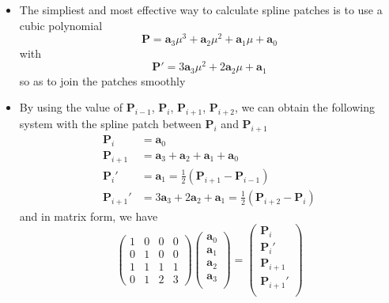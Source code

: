 \documentclass[twocolumn,landscape,10pt]{article}
\theoremstyle{definition}
\begin{document}
\begin{itemize}
    \item The simpliest and most effective way to calculate spline patches is to
        use a cubic polynomial
        \[
            \mathbf{P}=\mathbf{a}_3\mu^3+\mathbf{a}_2\mu^{2}+\mathbf{a}_1\mu+\mathbf{a}_0
        \]
        with
        \[
            \mathbf{P}'=3\mathbf{a}_3\mu^2+2\mathbf{a}_2\mu+\mathbf{a}_1
        \]
        so as to join the patches smoothly
    \item By using the value of $\mathbf{P}_{i-1}$, $\mathbf{P}_i$,
        $\mathbf{P}_{i+1}$, $\mathbf{P}_{i+2}$,
        we can obtain the following system with the spline patch
        between $\mathbf{P}_i$ and $\mathbf{P}_{i+1}$
        \begin{align*}
            \mathbf{P}_i &= \mathbf{a}_0 \\
            \mathbf{P}_{i+1} &= \mathbf{a}_3+\mathbf{a}_2+\mathbf{a}_1+\mathbf{a}_0 \\
            \mathbf{P}_i' &= \mathbf{a}_1 =
            \frac{1}{2}(\mathbf{P}_{i+1}-\mathbf{P}_{i-1}) \\
            \mathbf{P}_{i+1}' &=3\mathbf{a}_3+2\mathbf{a}_2+\mathbf{a}_1
            =\frac{1}{2}(\mathbf{P}_{i+2}-\mathbf{P}_i)
        \end{align*} 
        and in matrix form, we have
        \[
            \begin{pmatrix}
                1 & 0 & 0 & 0 \\
                0 & 1 & 0 & 0 \\
                1 & 1 & 1 & 1 \\
                0 & 1 & 2 & 3
            \end{pmatrix} 
            \begin{pmatrix}
                \mathbf{a}_0 \\
                \mathbf{a}_1 \\
                \mathbf{a}_2 \\
                \mathbf{a}_3 \\
            \end{pmatrix} 
            =
            \begin{pmatrix}
                \mathbf{P}_i \\
                \mathbf{P}_i' \\
                \mathbf{P}_{i+1} \\
                \mathbf{P}_{i+1}' \\
            \end{pmatrix} 
\]
\end{itemize}
\end{document}

